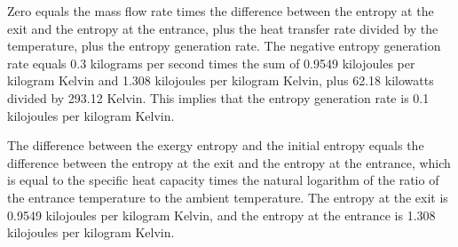 Zero equals the mass flow rate times the difference between the entropy at the exit and the entropy at the entrance, plus the heat transfer rate divided by the temperature, plus the entropy generation rate. The negative entropy generation rate equals 0.3 kilograms per second times the sum of 0.9549 kilojoules per kilogram Kelvin and 1.308 kilojoules per kilogram Kelvin, plus 62.18 kilowatts divided by 293.12 Kelvin. This implies that the entropy generation rate is 0.1 kilojoules per kilogram Kelvin.

The difference between the exergy entropy and the initial entropy equals the difference between the entropy at the exit and the entropy at the entrance, which is equal to the specific heat capacity times the natural logarithm of the ratio of the entrance temperature to the ambient temperature. The entropy at the exit is 0.9549 kilojoules per kilogram Kelvin, and the entropy at the entrance is 1.308 kilojoules per kilogram Kelvin.
